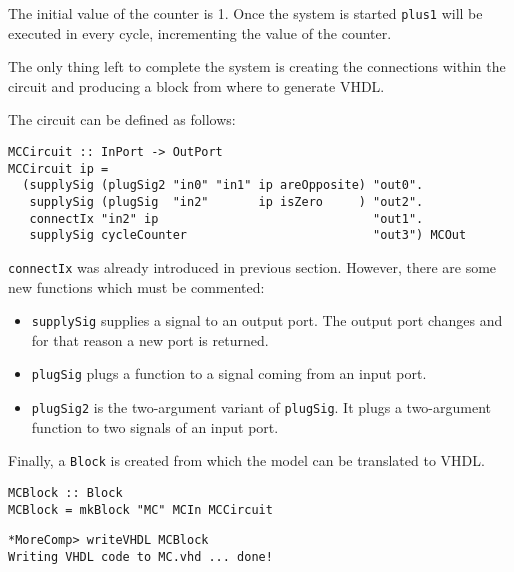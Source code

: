 The initial value of the counter is 1. Once the system is started
\texttt{plus1} will be executed in every cycle, incrementing the value
of the counter.

The only thing left to complete the system is creating the connections
within the circuit and producing a block from where to generate VHDL.


The circuit can be defined as follows:

\begin{lstlisting}
MCCircuit :: InPort -> OutPort
MCCircuit ip = 
  (supplySig (plugSig2 "in0" "in1" ip areOpposite) "out0".
   supplySig (plugSig  "in2"       ip isZero     ) "out2".
   connectIx "in2" ip                              "out1".
   supplySig cycleCounter                          "out3") MCOut
\end{lstlisting}

\texttt{connectIx} was already introduced in previous section. However,
there are some new functions which must be commented:

\begin{itemize}
\item \texttt{supplySig} supplies a signal to an output port. The
  output port changes and for that reason a new port is returned.
\item \texttt{plugSig} plugs a function to a signal  coming from an input
  port.
\item \texttt{plugSig2} is the two-argument variant of
  \texttt{plugSig}. It plugs a two-argument function to two signals of
  an input port. 
\end{itemize}

Finally, a \texttt{Block} is created from which the model can be
translated to VHDL.

\begin{lstlisting}
MCBlock :: Block
MCBlock = mkBlock "MC" MCIn MCCircuit
\end{lstlisting}

\begin{verbatim}
*MoreComp> writeVHDL MCBlock
Writing VHDL code to MC.vhd ... done!
\end{verbatim}

